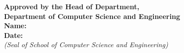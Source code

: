 \vspace{1.2cm}

\begin{center}
    {\fontsize{12}{15}\selectfont\textbf{Approved by the Head of Department,}}\\[0.2cm]
    {\fontsize{12}{15}\selectfont\textbf{Department of Computer Science and Engineering}}\\[0.8cm]
    \textbf{Name:}\ \makebox[6cm]{\hrulefill}\\[0.2cm]
    \textbf{Date:}\ \makebox[6cm]{\hrulefill}\\[0.8cm]
    {\fontsize{10}{12}\selectfont\textit{(Seal of School of Computer Science and Engineering)}}
\end{center}
